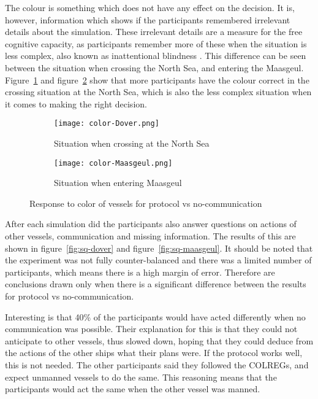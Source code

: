 The colour is something which does not have any effect on the decision. It is, however, information which shows if the participants remembered irrelevant details about the simulation. These irrelevant details are a measure for the free cognitive capacity, as participants remember more of these when the situation is less complex, also known as inattentional blindness \cite{Most2000}. This difference can be seen between the situation when crossing the North Sea, and entering the Maasgeul. Figure~\ref{fig:color-dover} and figure~\ref{fig:color-maasgeul} show that more participants have the colour correct in the crossing situation at the North Sea, which is also the less complex situation when it comes to making the right decision.

\begin{figure}[hbtp]
	\centering
	\begin{subfigure}[b]{0.75\textwidth}
		\texttt{[image: color-Dover.png]}
		\caption{Situation when crossing at the North Sea}
		\label{fig:color-dover}
	\end{subfigure}
	
	\begin{subfigure}[b]{0.75\textwidth}
		\centering
		\texttt{[image: color-Maasgeul.png]}
		\caption{Situation when entering Maasgeul}
		\label{fig:color-maasgeul}
	\end{subfigure}
	
	\caption{Response to color of vessels for protocol vs no-communication}
	\label{fig:experiment-color} 
\end{figure}

After each simulation did the participants also answer questions on actions of other vessels, communication and missing information. The results of this are shown in figure~\ref{fig:sq-dover} and figure~\ref{fig:sq-maasgeul}. It should be noted that the experiment was not fully counter-balanced and there was a limited number of participants, which means there is a high margin of error. Therefore are conclusions drawn only when there is a significant difference between the results for protocol vs no-communication. 

Interesting is that 40\% of the participants would have acted differently when no communication was possible. Their explanation for this is that they could not anticipate to other vessels, thus slowed down, hoping that they could deduce from the actions of the other ships what their plans were. If the protocol works well, this is not needed. The other participants said they followed the \ac{COLREGs}, and expect unmanned vessels to do the same. This reasoning means that the participants would act the same when the other vessel was manned.

